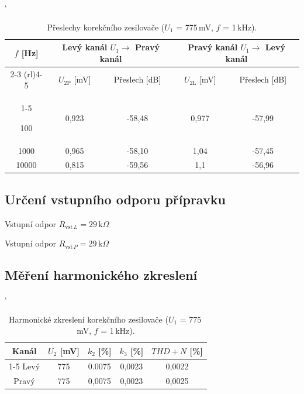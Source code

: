 \documentclass[a4paper, czech]{article}
\begin{document}
\begin{table}[H]
    \catcode`
    \centering
    \caption{Přeslechy korekčního zesilovače ($U_1$ = 775\,mV, $f$ = 1\,kHz).}

    \begin{tabular}{ccccc}
        \toprule
        \multirow{2}{*}{\setstretch{2}$f$ [Hz]} & \multicolumn{2}{c}{Levý kanál $U_1 \rightarrow$ Pravý kanál} & \multicolumn{2}{c}{Pravý kanál $U_1 \rightarrow$ Levý kanál} \\
        \cmidrule(rl){2-3}
        \cmidrule(rl){4-5}
        & $U_{2\text{P}}$ [mV] & Přeslech [dB] & $U_{2\text{L}}$ [mV] & Přeslech [dB] \\
        \cmidrule(rl){1-5}

        100   & 0,923 & -58,48 & 0,977 & -57,99 \\
        1000  & 0,965 & -58,10 & 1,04  & -57,45 \\
        10000 & 0,815 & -59,56 & 1,1   & -56,96 \\
        \bottomrule
    \end{tabular}
\end{table}

\subsection{Určení vstupního odporu přípravku}

Vstupní odpor $R_{\text{vst}\, L} = 29\,\text{k}\Omega$

Vstupní odpor $R_{\text{vst}\, P} = 29\,\text{k}\Omega$

\subsection{Měření harmonického zkreslení}

\begin{table}[H]
    \catcode`
    \centering
    \caption{Harmonické zkreslení korekčního zesilovače ($U_1$ = 775\,mV, $f$ = 1\,kHz).}

    \begin{tabular}{ccccc}
        \toprule
        Kanál & $U_2$ [mV] & $k_2$ [\%] & $k_3$ [\%] & $THD+N$ [\%] \\
        \cmidrule(rl){1-5}
        Levý  & 775     & 0.0075  & 0,0023  & 0,0022     \\
        Pravý & 775     & 0,0075  & 0,0023  & 0,0025     \\
        \bottomrule
    \end{tabular}
\end{table}
\end{document}
